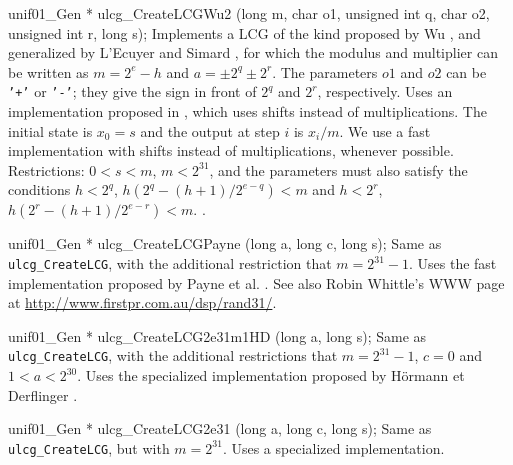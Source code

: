 unif01_Gen * ulcg_CreateLCGWu2 (long m, char o1, unsigned int q, char o2, 
                                unsigned int r, long s);
\endcode
  \tab  Implements a LCG of the kind proposed by Wu \cite{rWU97a},
   and generalized by L'Ecuyer and Simard \cite{rLEC99e}, for which
   the modulus and multiplier can be written as 
   $m = 2^e -h$ and $a = \pm 2^q \pm 2^r$.
%
   The parameters $o1$ and $o2$ can be {\tt '+'} or {\tt '-'};
   they give the sign in front of $2^q$ and $2^r$, respectively.
   Uses an implementation proposed in \cite{rLEC99e,rWU97a}, 
   which uses shifts instead of multiplications.
   The initial state is $x_0 = s$ and the output at step $i$ is $x_i/m$.
   We use a fast implementation with shifts instead of multiplications,
   whenever possible.
   Restrictions: $0 < s < m$, $m < 2^{31}$, 
   and the parameters must also satisfy the conditions $h < 2^q$,
   $h(2^q - (h+1)/{2^{e-q}}) < m$ and  $h < 2^r$,
     $h(2^r - (h+1)/{2^{e-r}}) < m$.
 .
 \endtab
\code


unif01_Gen * ulcg_CreateLCGPayne (long a, long c, long s);
\endcode
  \tab  Same as {\tt ulcg\_CreateLCG}, with the additional restriction that
   $m=2^{31}-1$.
%
   Uses the fast implementation proposed by Payne et al. \cite{rPAY69a,rCAR90a}.
 See also Robin Whittle's WWW page at \url{http://www.firstpr.com.au/dsp/rand31/}.
  \endtab
\code


unif01_Gen * ulcg_CreateLCG2e31m1HD (long a, long s);
\endcode
  \tab  Same as {\tt ulcg\_CreateLCG}, with the additional restrictions that
   $m=2^{31}-1$, $c=0$ and $1< a < 2^{30}$.
%
   Uses the specialized implementation proposed
   by H\"ormann et Derflinger \cite{rHOR93a}.
  \endtab
\code


unif01_Gen * ulcg_CreateLCG2e31 (long a, long c, long s);
\endcode
  \tab  Same as {\tt ulcg\_CreateLCG}, but with
   $m=2^{31}$.  Uses a specialized implementation.
  \endtab
\code


